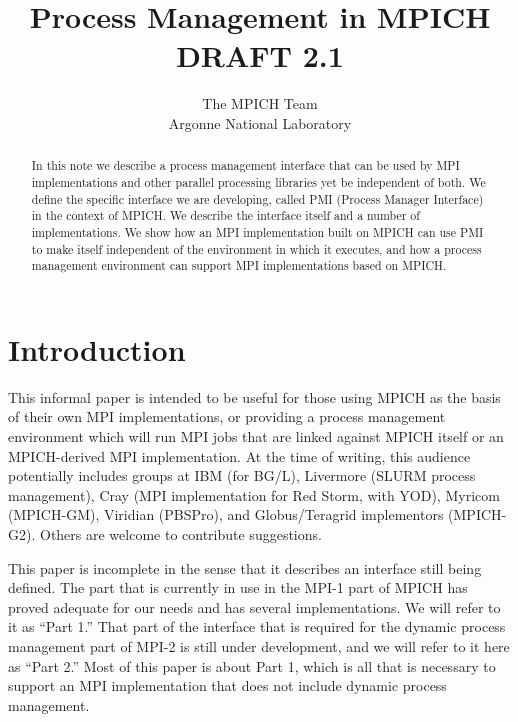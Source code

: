 \documentclass[11pt]{article}
\begin{document}
\title{{\bf Process Management in MPICH}\\[.2in] DRAFT 2.1}
\author{The MPICH Team\\Argonne National Laboratory}
\maketitle

\begin{abstract}
  In this note we describe a process management interface that can be
  used by MPI implementations and other parallel processing libraries
  yet be independent of both.  We define the specific interface we are
  developing, called PMI (Process Manager Interface) in the context of
  MPICH.  We describe the interface itself and a number of
  implementations.  We show how an MPI implementation built on MPICH
  can use PMI to make itself independent of the environment in which it
  executes, and how a process management environment can support MPI
  implementations based on MPICH.
\end{abstract}

\section{Introduction}
\label{sec:introduction}

This informal paper is intended to be useful for those using MPICH as the
basis of their own MPI implementations, or providing a process
management environment which will run MPI jobs that are linked against
MPICH itself or an MPICH-derived MPI implementation.  At the time of
writing, this audience potentially includes groups at IBM (for BG/L), Livermore
(SLURM process management), Cray (MPI implementation for Red Storm, with
YOD), Myricom (MPICH-GM), Viridian (PBSPro), and Globus/Teragrid
implementors (MPICH-G2).  Others are welcome to contribute suggestions.

This paper is incomplete in the sense that it describes an interface
still being defined.  The part that is currently in use in the MPI-1
part of MPICH has proved adequate for our needs and has several
implementations.  We will refer to it as ``Part 1.''  That part of the
interface that is required for the dynamic process management part of
MPI-2 is still under development, and we will refer to it here as ``Part
2.''  Most of this paper is about Part 1, which is all that is necessary
to support an MPI implementation that does not include dynamic process
management.
\end{document}
